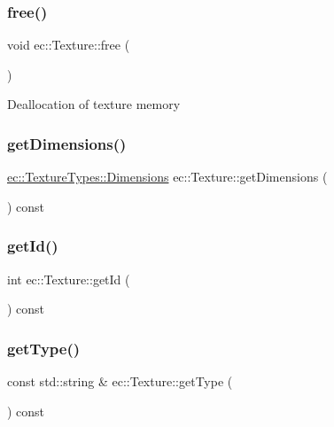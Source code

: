 \mbox{\label{classec_1_1_texture_a57242daae8cc1ea827848f9b7f7b7fbb}} 
\subsubsection{\texorpdfstring{free()}{free()}}
{\footnotesize\ttfamily void ec\+::\+Texture\+::free (\begin{DoxyParamCaption}{ }\end{DoxyParamCaption})}

Deallocation of texture memory \mbox{\label{classec_1_1_texture_a5d1e6d8dd6c98ea036caf2696e47637a}} 
\subsubsection{\texorpdfstring{get\+Dimensions()}{getDimensions()}}
{\footnotesize\ttfamily \mbox{\hyperlink{structec_1_1_texture_types_ac0e07f24452fa28dd8e6e33a224842fc}{ec\+::\+Texture\+Types\+::\+Dimensions}} ec\+::\+Texture\+::get\+Dimensions (\begin{DoxyParamCaption}{ }\end{DoxyParamCaption}) const}

\mbox{\label{classec_1_1_texture_a0097b0b1826d7339ae109a187b6304d5}} 
\subsubsection{\texorpdfstring{get\+Id()}{getId()}}
{\footnotesize\ttfamily int ec\+::\+Texture\+::get\+Id (\begin{DoxyParamCaption}{ }\end{DoxyParamCaption}) const}

\mbox{\label{classec_1_1_texture_a1c33bc610c0b5c7807fa92897320349f}} 
\subsubsection{\texorpdfstring{get\+Type()}{getType()}}
{\footnotesize\ttfamily const std\+::string \& ec\+::\+Texture\+::get\+Type (\begin{DoxyParamCaption}{ }\end{DoxyParamCaption}) const}

